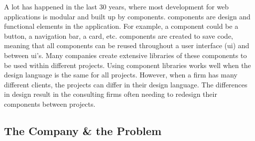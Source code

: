 A lot has happened in the last 30 years, where most development for web applications is modular and built up by \glspl{component}. \Glspl{component} are design and functional elements in the application. For example, a \gls{component} could be a button, a navigation bar, a card\cite{babichSimpleDesignTips2020}, etc. \Glspl{component} are created to save code, meaning that all \glspl{component} can be reused throughout a user interface (\acrshort{ui}) and between \acrshort{ui}'s. Many companies create extensive libraries of these \glspl{component} to be used within different projects. Using \gls{component} libraries works well when the design language is the same for all projects. However, when a firm has many different clients, the projects can differ in their design language. The differences in design result in the consulting firms often needing to redesign their \glspl{component} between projects. 





\subsection{The Company \& the Problem}
\label{sub:company}





